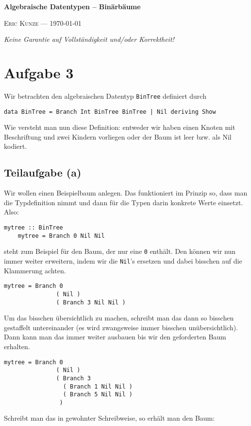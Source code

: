 \documentclass[ngerman, a4paper, 11pt]{article}
\theoremstyle{nonumberplain}
\newcommand*\ruleline[1]{\par\noindent\raisebox{.8ex}{\makebox[\linewidth]{\hrulefill\hspace{1ex}\raisebox{-.8ex}{#1}\hspace{1ex}\hrulefill}}}
\begin{document}
	\begin{center}
		{\bfseries \sffamily \huge Algebraische Datentypen -- Binärbäume} 
		
		\ruleline{\sffamily \Large Übungsblatt 2}
		
		{\scshape Eric Kunze --- \today}
	\end{center}
	\medskip
	
	{ \footnotesize \doclicenseThis }
	
	\begin{center}
		\small \slshape Keine Garantie auf Vollständigkeit und/oder Korrektheit!
	\end{center}
	
\section*{Aufgabe 3}

Wir betrachten den algebraischen Datentyp \texttt{BinTree} definiert durch
\begin{lstlisting}[style=noframe]
	data BinTree = Branch Int BinTree BinTree | Nil deriving Show
\end{lstlisting}
Wie versteht man nun diese Definition: entweder wir haben einen Knoten mit Beschriftung und zwei Kindern vorliegen oder der Baum ist leer bzw. als Nil kodiert.


\subsection*{Teilaufgabe (a)}

Wir wollen einen Beispielbaum anlegen. Das funktioniert im Prinzip so, dass man die Typdefinition nimmt und dann für die Typen darin konkrete Werte einsetzt. Also:
\begin{lstlisting}[style=noframe]
	mytree :: BinTree
	mytree = Branch 0 Nil Nil
\end{lstlisting}
steht zum Beispiel für den Baum, der nur eine \texttt{0} enthält. Den können wir nun immer weiter erweitern, indem wir die \texttt{Nil}'s ersetzen und dabei bisschen auf die Klammerung achten. 
\begin{lstlisting}[style=noframe]
	mytree = Branch 0 
	           ( Nil )
	           ( Branch 3 Nil Nil )
\end{lstlisting}
Um das bisschen übersichtlich zu machen, schreibt man das dann so bisschen gestaffelt untereinander (es wird zwangsweise immer bisschen unübersichtlich). Dann kann man das immer weiter ausbauen bis wir den geforderten Baum erhalten.
\begin{lstlisting}[style=frame, firstnumber=12]
	mytree = Branch 0 
	           ( Nil )
	           ( Branch 3 
	             ( Branch 1 Nil Nil )
	             ( Branch 5 Nil Nil )
	            )
\end{lstlisting}
Schreibt man das in gewohnter Schreibweise, so erhält man den Baum:
\end{document}

